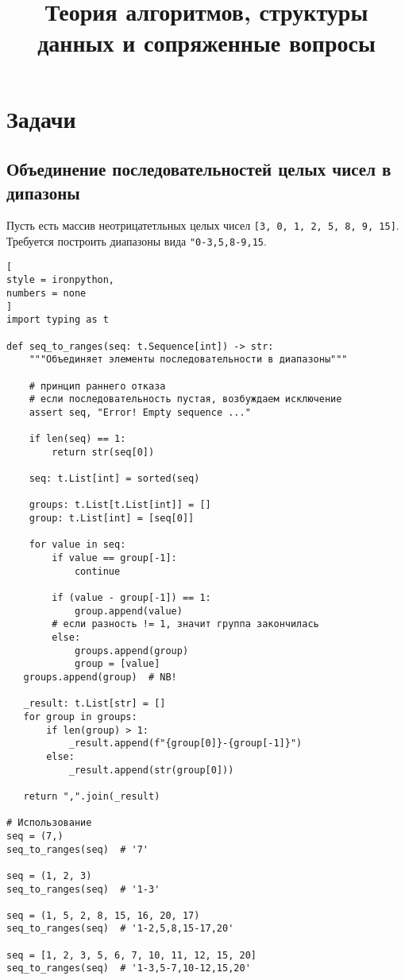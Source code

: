 \documentclass[%
	11pt,
	a4paper,
	utf8,
		]{article}
\begin{document}
\title{Теория алгоритмов, структуры данных и сопряженные вопросы}

\author{}

\date{}
\maketitle

\thispagestyle{fancy}

\tableofcontents

\section{Задачи}

\subsection{Объединение последовательностей целых чисел в дипазоны}

Пусть есть массив неотрицатетльных целых чисел \verb|[3, 0, 1, 2, 5, 8, 9, 15]|. Требуется построить диапазоны вида \verb|"0-3,5,8-9,15|.

\begin{lstlisting}[
style = ironpython,
numbers = none
]
import typing as t

def seq_to_ranges(seq: t.Sequence[int]) -> str:
    """Объединяет элементы последовательности в диапазоны"""
    
    # принцип раннего отказа
    # если последовательность пустая, возбуждаем исключение
    assert seq, "Error! Empty sequence ..."
    
    if len(seq) == 1:
        return str(seq[0])
    
    seq: t.List[int] = sorted(seq)
    
    groups: t.List[t.List[int]] = []
    group: t.List[int] = [seq[0]]
    
    for value in seq:
        if value == group[-1]:
            continue
            
        if (value - group[-1]) == 1:
            group.append(value)
        # если разность != 1, значит группа закончилась
        else:
            groups.append(group)
            group = [value]
   groups.append(group)  # NB! 
            
   _result: t.List[str] = []
   for group in groups:
       if len(group) > 1:
           _result.append(f"{group[0]}-{group[-1]}")
       else:
           _result.append(str(group[0]))
   
   return ",".join(_result)

# Использование
seq = (7,)
seq_to_ranges(seq)  # '7'

seq = (1, 2, 3)
seq_to_ranges(seq)  # '1-3'

seq = (1, 5, 2, 8, 15, 16, 20, 17)
seq_to_ranges(seq)  # '1-2,5,8,15-17,20'

seq = [1, 2, 3, 5, 6, 7, 10, 11, 12, 15, 20]
seq_to_ranges(seq)  # '1-3,5-7,10-12,15,20'
\end{lstlisting}
\end{document}

